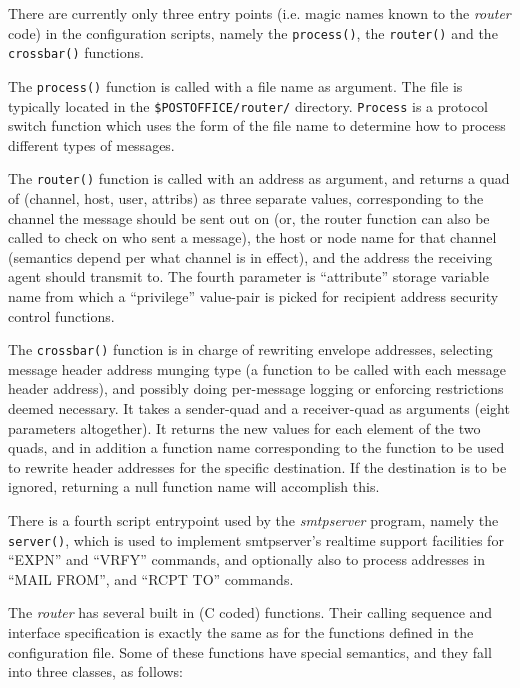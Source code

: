 There are currently only three entry points (i.e. magic names known to the
{\em router} code) in the configuration scripts, namely the {\tt process()},
the {\tt router()} and the {\tt crossbar()} functions.


The {\tt process()} function is called with a file name as argument. 
The file is typically located in the {\tt \$POSTOFFICE/router/} 
directory. {\tt Process} is a protocol switch function which uses the 
form of the file name to determine how to process different types of 
messages.

The {\tt router()} function is called with an address as argument,
and returns a quad of (channel, host, user, attribs) as three
separate values,  corresponding to the channel the message should
be sent out on (or, the router function can also be called to check
on who sent a message), the host or node name for that channel
(semantics depend per what channel is in effect), and the address
the receiving agent should transmit to.
The fourth parameter is ``attribute'' storage variable name from
which a ``privilege'' value-pair is picked for recipient address
security control functions.

The {\tt crossbar()} function is in charge of rewriting envelope addresses,
selecting message header address munging type (a function to be called with
each message header address), and possibly doing per-message logging or
enforcing restrictions deemed necessary.
It takes a sender-quad and a receiver-quad as arguments (eight parameters
altogether).
It returns the new values for each element of the two quads, and in addition
a function name corresponding to the function to be used to rewrite header
addresses for the specific destination.
If the destination is to be ignored, returning a null function name will
accomplish this.


There is a fourth script entrypoint used by the {\em smtpserver} program,
namely the {\tt server()}, which is used to implement smtpserver's
realtime support facilities for ``EXPN'' and ``VRFY'' commands, and
optionally also to process addresses in ``MAIL FROM'', and ``RCPT TO''
commands.

The {\em router} has several built in (C coded) functions.
Their calling sequence and interface specification is exactly the same
as for the functions defined in the configuration file.
Some of these functions have special semantics, and they fall into three
classes, as follows:


